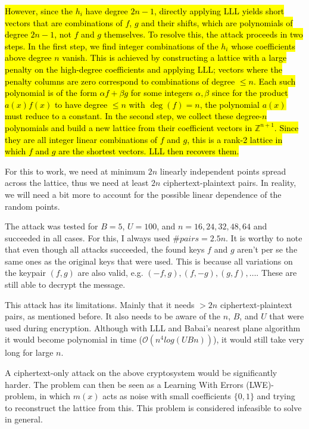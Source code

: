 \documentclass{article}
\begin{document}
\hl{However, since the $h_i$ have degree $2n-1$, directly applying LLL yields short vectors that are combinations of $f$, $g$ and their shifts, which are polynomials of degree $2n-1$, not $f$ and $g$ themselves. To resolve this, the attack proceeds in two steps. In the first step, we find integer combinations of the $h_i$ whose coefficients above degree $n$ vanish. This is achieved by constructing a lattice with a large penalty on the high-degree coefficients and applying LLL; vectors where the penalty columns are zero correspond to combinations of degree $\leq n$. Each such polynomial is of the form $\alpha f + \beta g$ for some integers $\alpha, \beta$ since for the product $a(x)f(x)$ to have degree $\leq n$ with $\deg(f) = n$, the polynomial $a(x)$ must reduce to a constant. In the second step, we collect these degree-$n$ polynomials and build a new lattice from their coefficient vectors in $\mathbb{Z}^{n+1}$. Since they are all integer linear combinations of 
$f$ and $g$, this is a rank-2 lattice in which $f$ and $g$ are the shortest vectors. LLL then recovers them.}

For this to work, we need at minimum $2n$ linearly independent points spread across the lattice, thus we need at least $2n$ ciphertext-plaintext pairs. In reality, we will need a bit more to account for the possible linear dependence of the random points.

The attack was tested for $B = 5$, $U = 100$, and $n=16,24,32,48,64$ and succeeded in all cases. For this, I always used $\#pairs = 2.5n$. It is worthy to note that even though all attacks succeeded, the found keys $f$ and $g$ aren't per se the same ones as the original keys that were used. This is because all variations on the keypair $(f, g)$ are also valid, e.g. $(-f, g), (f, -g), (g, f), \dots$. These are still able to decrypt the message.

This attack has its limitations. Mainly that it needs $ > 2n$ ciphertext-plaintext pairs, as mentioned before. It also needs to be aware of the $n$, $B$, and $U$ that were used during encryption. Although with LLL and Babai's nearest plane algorithm it would become polynomial in time ($\mathcal{O}(n^4log(UBn))$), it would still take very long for large $n$. 

A ciphertext-only attack on the above cryptosystem would be significantly harder. The problem can then be seen as a Learning With Errors (LWE)-problem, in which $m(x)$ acts as noise with small coefficients $\{0, 1\}$ and trying to reconstruct the lattice from this. This problem is considered infeasible to solve in general.
\printbibliography
\end{document}

